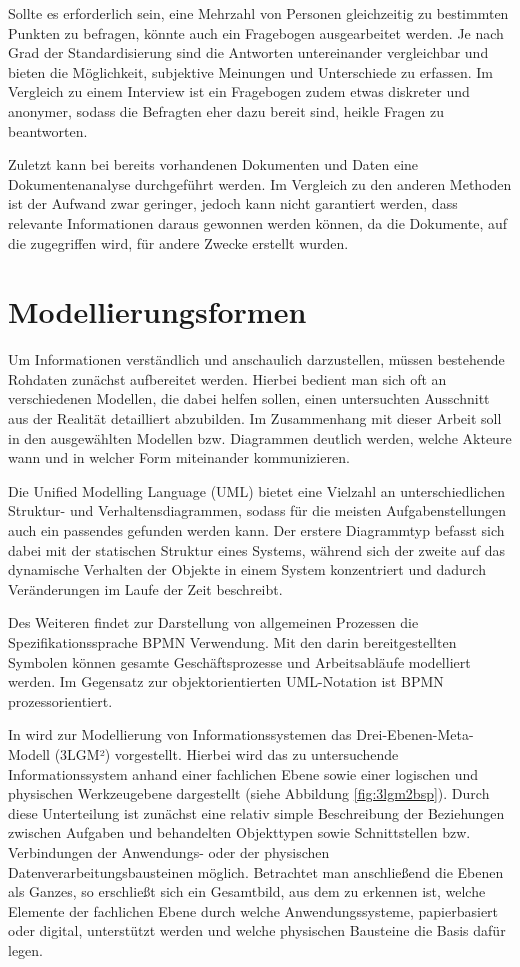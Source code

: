 Sollte es erforderlich sein, eine Mehrzahl von Personen gleichzeitig zu bestimmten Punkten zu befragen, könnte auch ein Fragebogen ausgearbeitet werden. Je nach Grad der Standardisierung sind die Antworten untereinander vergleichbar und bieten die Möglichkeit, subjektive Meinungen und Unterschiede zu erfassen. Im Vergleich zu einem Interview ist ein Fragebogen zudem etwas diskreter und anonymer, sodass die Befragten eher dazu bereit sind, heikle Fragen zu beantworten.

Zuletzt kann bei bereits vorhandenen Dokumenten und Daten eine Dokumentenanalyse durchgeführt werden. Im Vergleich zu den anderen Methoden ist der Aufwand zwar geringer, jedoch kann nicht garantiert werden, dass relevante Informationen daraus gewonnen werden können, da die Dokumente, auf die zugegriffen wird, für andere Zwecke erstellt wurden. \citep{Doering.2015}


\section{Modellierungsformen}

Um Informationen verständlich und anschaulich darzustellen, müssen bestehende Rohdaten zunächst aufbereitet werden. Hierbei bedient man sich oft an verschiedenen Modellen, die dabei helfen sollen, einen untersuchten Ausschnitt aus der Realität detailliert abzubilden. Im Zusammenhang mit dieser Arbeit soll in den ausgewählten Modellen bzw. Diagrammen deutlich werden, welche Akteure wann und in welcher Form miteinander kommunizieren.

Die Unified Modelling Language (UML) bietet eine Vielzahl an unterschiedlichen Struktur- und Verhaltensdiagrammen, sodass für die meisten Aufgabenstellungen auch ein passendes gefunden werden kann. Der erstere Diagrammtyp befasst sich dabei mit der statischen Struktur eines Systems, während sich der zweite auf das dynamische Verhalten der Objekte in einem System konzentriert und dadurch Veränderungen im Laufe der Zeit beschreibt. 

Des Weiteren findet zur Darstellung von allgemeinen Prozessen die Spezifikationssprache BPMN Verwendung. Mit den darin bereitgestellten Symbolen können gesamte Geschäftsprozesse und Arbeitsabläufe modelliert werden. Im Gegensatz zur objektorientierten UML-Notation ist BPMN prozessorientiert.

In \citet{Winter.2023} wird zur Modellierung von Informationssystemen das Drei-Ebenen-Meta-Modell (3LGM²) vorgestellt. Hierbei wird das zu untersuchende Informationssystem anhand einer fachlichen Ebene sowie einer logischen und physischen Werkzeugebene dargestellt (siehe Abbildung \ref{fig:3lgm2bsp}). Durch diese Unterteilung ist zunächst eine relativ simple Beschreibung der Beziehungen zwischen Aufgaben und behandelten Objekttypen sowie Schnittstellen bzw. Verbindungen der Anwendungs- oder der physischen Datenverarbeitungsbausteinen möglich. Betrachtet man anschließend die Ebenen als Ganzes, so erschließt sich ein Gesamtbild, aus dem zu erkennen ist, welche Elemente der fachlichen Ebene durch welche Anwendungssysteme, papierbasiert oder digital, unterstützt werden und welche physischen Bausteine die Basis dafür legen.